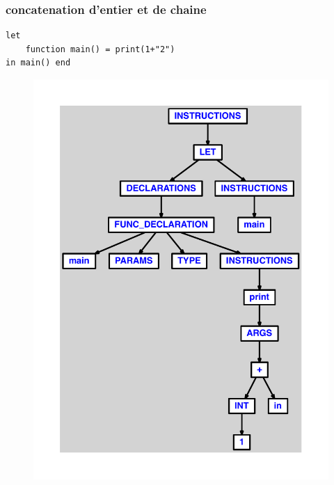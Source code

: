 \documentclass{article}
\begin{document}
\subsubsection{concatenation d'entier et de chaine}
\begin{lstlisting}
let
	function main() = print(1+"2")
in main() end
\end{lstlisting}
\newpage
\begin{figure}[H]
\centering
\includegraphics[max width=\textwidth]{ast/ast_141.pdf}
\end{figure}
\newpage
\end{document}

